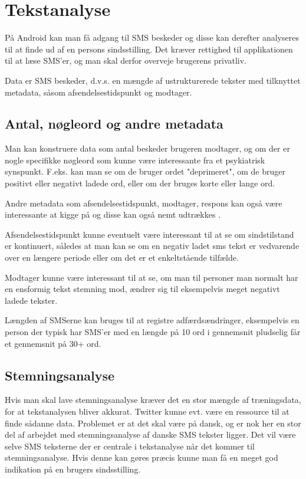 \section{Tekstanalyse}
På Android kan man få adgang til SMS beskeder og disse kan derefter analyseres til at finde ud af en persons sindsstilling. Det kræver rettighed til applikationen til at læse SMS'er, og man skal derfor overveje brugerens privatliv. 

Data er SMS beskeder, d.v.s. en mængde af ustrukturerede tekster med tilknyttet metadata, såsom afsendelsestidspunkt og modtager.

\subsection{Antal, nøgleord og andre metadata}
Man kan konstruere data som antal beskeder brugeren modtager, og om der er nogle specifikke nøgleord som kunne være interessante fra et psykiatrisk synspunkt. F.eks. kan man se om de bruger ordet "deprimeret", om de bruger positivt eller negativt ladede ord, eller om der bruges korte eller lange ord. 

Andre metadata som afsendelsestidspunkt, modtager, respons kan også være interessante at kigge på og disse kan også nemt udtrækkes \citep{misc:androidsmsread}.

Afsendelsestidspunkt kunne eventuelt være interessant til at se om sindstilstand er kontinuert, således at man kan se om en negativ ladet sms tekst er vedvarende over en længere periode eller om det er et enkeltstående tilfælde.
		
Modtager kunne være interessant til at se, om man til personer man normalt har en ensformig tekst stemning mod, ændrer sig til eksempelvis meget negativt ladede tekster.

Længden af SMSerne kan bruges til at registre adfærdsændringer, eksempelvis en person der typisk har SMS'er med en længde på 10 ord i gennemsnit pludselig får et gennemsnit på 30+ ord.


\subsection{Stemningsanalyse}
Hvis man skal lave stemningsanalyse kræver det en stor mængde af træningsdata, for at tekstanalysen bliver akkurat. Twitter kunne evt. være en ressource til at finde sådanne data. Problemet er at det skal være på dansk, og er nok her en stor del af arbejdet med stemningsanalyse af danske SMS tekster ligger.
Det vil være selve SMS teksterne der er centrale i tekstanalyse når det kommer til stemningsanalyse. 
Hvis denne kan gøres præcis kunne man få en meget god indikation på en brugers sindsstilling.

